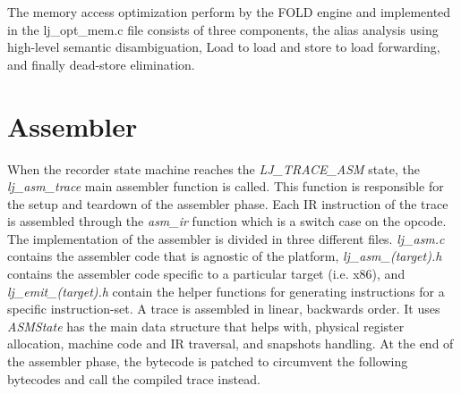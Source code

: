 The memory access optimization perform by the FOLD engine and implemented
in the lj\_opt\_mem.c file consists of three components, the alias
analysis using high-level semantic disambiguation, Load to load and store to load forwarding, and finally dead-store elimination.    


\section{Assembler}
\label{Sec:TA}

When the recorder state machine reaches the \emph{LJ\_TRACE\_ASM} state, the
\emph{lj\_asm\_trace} main assembler function is called. This function is
responsible for the setup and teardown of the assembler phase. Each IR
instruction of the trace is assembled through the \emph{asm\_ir} function which
is a switch case on the opcode. The implementation of the assembler is divided
in three different files. \emph{lj\_asm.c} contains the assembler code that is
agnostic of the platform, \emph{lj\_asm\_(target).h} contains the assembler code
specific to a particular target (i.e. x86), and \emph{lj\_emit\_(target).h}
contain the helper functions for generating instructions for a specific
instruction-set. A trace is assembled in linear, backwards order. It uses
\emph{ASMState} has the main data structure that helps with, physical register
allocation, machine code and IR traversal, and snapshots handling. At the end of
the assembler phase, the bytecode is patched to circumvent the following bytecodes
and call the compiled trace instead.

